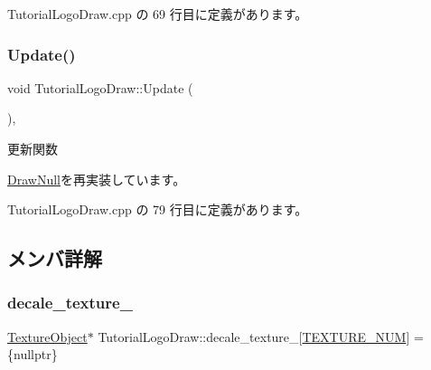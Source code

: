  Tutorial\+Logo\+Draw.\+cpp の 69 行目に定義があります。

\mbox{\label{class_tutorial_logo_draw_af69405fcc8b20684a19e982726d93ffa}} 
\subsubsection{\texorpdfstring{Update()}{Update()}}
{\footnotesize\ttfamily void Tutorial\+Logo\+Draw\+::\+Update (\begin{DoxyParamCaption}{ }\end{DoxyParamCaption})\hspace{0.3cm}{\ttfamily [override]}, {\ttfamily [virtual]}}



更新関数 



\mbox{\hyperlink{class_draw_null_a0149bcf84a34b138642ab7975ae46f30}{Draw\+Null}}を再実装しています。



 Tutorial\+Logo\+Draw.\+cpp の 79 行目に定義があります。



\subsection{メンバ詳解}
\mbox{\label{class_tutorial_logo_draw_afb10b575221308bfb7f86e276086aad6}} 
\subsubsection{\texorpdfstring{decale\+\_\+texture\+\_\+}{decale\_texture\_}}
{\footnotesize\ttfamily \mbox{\hyperlink{class_texture_object}{Texture\+Object}}$\ast$ Tutorial\+Logo\+Draw\+::decale\+\_\+texture\+\_\+\mbox{[}\mbox{\hyperlink{class_tutorial_logo_draw_aff3396323c386d499aa23e5605085ab1}{T\+E\+X\+T\+U\+R\+E\+\_\+\+N\+UM}}\mbox{]} = \{nullptr\}\hspace{0.3cm}{\ttfamily [private]}}



